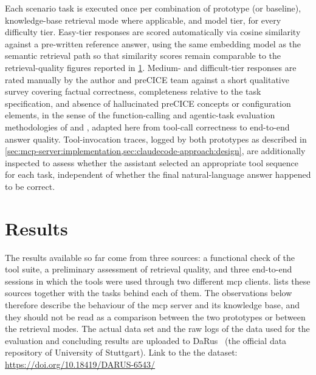 \documentclass[
  numbers=noenddot,
  english,
  a4paper,
  twoside,
  bibliography=totoc,
  headsepline,
  cleardoublepage=empty,
  parskip=half,
  draft=false
]{scrbook}
\theoremstyle{break}
\renewcommand{\_}{\textunderscore\allowbreak}
\begin{document}
Each scenario task is executed once per combination of prototype (or baseline), knowledge-base
retrieval mode where applicable, and model tier, for every difficulty tier.
Easy-tier responses are scored automatically via cosine similarity against a pre-written
reference answer, using the same embedding model as the semantic retrieval path so that
similarity scores remain comparable to the retrieval-quality figures reported in
\cref{sec:evaluation:results}.
Medium- and difficult-tier responses are rated manually by the author and preCICE team against a short
qualitative survey covering factual correctness, completeness relative to the task
specification, and absence of hallucinated preCICE concepts or configuration elements, in the
sense of the function-calling and agentic-task evaluation methodologies of
\citeauthor{patil2025bfcl} \cite{patil2025bfcl} and \citeauthor{wang2025mcpbench}
\cite{wang2025mcpbench}, adapted here from tool-call correctness to end-to-end answer quality.
Tool-invocation traces, logged by both prototypes as described in
\cref{sec:mcp-server:implementation,sec:claudecode-approach:design}, are additionally inspected
to assess whether the assistant selected an appropriate tool sequence for each task, independent
of whether the final natural-language answer happened to be correct.


\section{Results}\label{sec:evaluation:results}


The results available so far come from three sources: a functional check of the tool suite, a
preliminary assessment of retrieval quality, and three end-to-end sessions in which the tools
were used through two different \gls{mcp} clients.
 lists these sources together with the tasks behind each of them.
The observations below therefore describe the behaviour of the \gls{mcp} server and its
knowledge base, and they should not be read as a comparison between the two prototypes or
between the retrieval modes.
The actual data set and the raw logs of the data used for the evaluation and concluding results are 
uploaded to DaRus~\cite{DARUS-6543_2026} (the official data repository of University of Stuttgart). Link to the 
the dataset: \url{https://doi.org/10.18419/DARUS-6543/}
\end{document}
